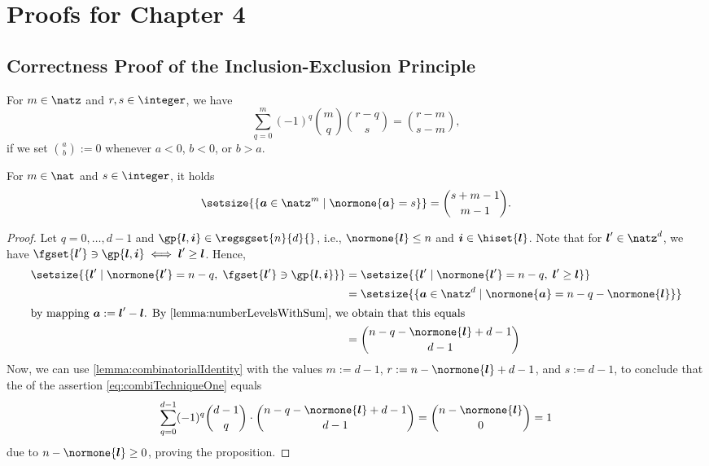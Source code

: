 \section{Proofs for Chapter 4}

\subsection{Correctness Proof of the Inclusion-Exclusion Principle}
\label{sec:proofInclusionExclusion}

\begin{lemma}
  \label{lemma:combinatorialIdentity}
  For $m \in \natz$ and $r, s \in \integer$, we have
  \begin{equation}
  \sum_{q=0}^m (-1)^q \binom{m}{q} \binom{r-q}{s}
  = \binom{r-m}{s-m},
  \end{equation}
  if we set $\binom{a}{b} := 0$ whenever $a < 0$, $b < 0$, or $b > a$.
\end{lemma}

\begin{lemma}
  \label{lemma:numberLevelsWithSum}
  For $m \in \nat$ and $s \in \integer$, it holds
  \begin{equation}
  \setsize{\{\*a \in \natz^m \mid \normone{\*a} = s\}}
  = \binom{s+m-1}{m-1}.
  \end{equation}
\end{lemma}

\propCombiTechniqueOne*

\begin{proof}
  Let $q = 0, \dotsc, d - 1$ and $\gp{\*l,\*i} \in \regsgset{n}{d}{}$, i.e.,
  $\normone{\*l} \le n$ and $\*i \in \hiset{\*l}$.
  Note that for $\*l' \in \natz^d$, we have
  $\fgset{\*l'} \ni \gp{\*l,\*i} \iff \*l' \ge \*l$.
  Hence,
  \begin{subequations}
    \begin{align}
    \setsize{
      \{\*l' \mid \normone{\*l'} = n - q,\; \fgset{\*l'} \ni \gp{\*l,\*i}\}
    }
    &= \setsize{
      \{\*l' \mid \normone{\*l'} = n - q,\; \*l' \ge \*l\}
    }\\
    &= \setsize{
      \{\*a \in \natz^d \mid \normone{\*a} = n - q - \normone{\*l}\}
    }\\
    \intertext{%
      by mapping $\*a := \*l' - \*l$.
      By \cref{lemma:numberLevelsWithSum}, we obtain
      that this equals%
    }
    &= \binom{n - q - \normone{\*l} + d - 1}{d - 1}
    \end{align}
  \end{subequations}
  Now, we can use \cref{lemma:combinatorialIdentity}
  with the values
  $m := d - 1$,
  $r := n - \normone{\*l} + d - 1$, and
  $s := d - 1$,
  to conclude that the \lhs of the assertion
  \eqref{eq:combiTechniqueOne} equals
  \begin{equation}
  \sum_{q=0}^{d-1} (-1)^q \binom{d-1}{q} \cdot
  \binom{n - q - \normone{\*l} + d - 1}{d - 1}
  = \binom{n - \normone{\*l}}{0}
  = 1
  \end{equation}
  due to $n - \normone{\*l} \ge 0$, proving the proposition.
\end{proof}

